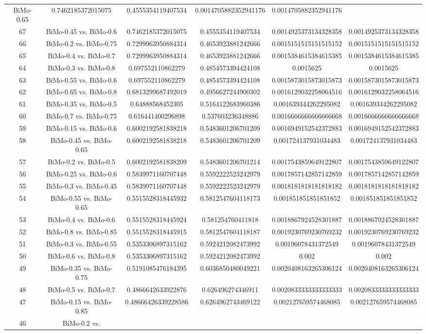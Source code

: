 \documentclass[a4paper,10pt]{article}
\begin{document}
\begin{landscape}
\begin{table}[!htp]
\begin{tabular}{cccccc}
BiMo-0.65&0.7462185372015075&0.4555354119407534&0.0014705882352941176&0.0014705882352941176\\67&BiMo-0.45 vs. BiMo-0.6&0.7462185372015075&0.4555354119407534&0.0014925373134328358&0.0014925373134328358\\66&BiMo-0.2 vs. BiMo-0.75&0.7299963950884314&0.4653923881242666&0.0015151515151515152&0.0015151515151515152\\65&BiMo-0.4 vs. BiMo-0.7&0.7299963950884314&0.4653923881242666&0.0015384615384615385&0.0015384615384615385\\64&BiMo-0.3 vs. BiMo-0.8&0.697552110862279&0.4854573394424108&0.0015625&0.0015625\\63&BiMo-0.55 vs. BiMo-0.6&0.697552110862279&0.4854573394424108&0.0015873015873015873&0.0015873015873015873\\62&BiMo-0.65 vs. BiMo-0.8&0.6813299687492019&0.4956627244900302&0.0016129032258064516&0.0016129032258064516\\61&BiMo-0.35 vs. BiMo-0.5&0.64888568452305&0.5164122683960386&0.001639344262295082&0.001639344262295082\\60&BiMo-0.7 vs. BiMo-0.75&0.616441400296898&0.537603236348886&0.0016666666666666668&0.0016666666666666668\\59&BiMo-0.15 vs. BiMo-0.6&0.6002192581838218&0.5483601206701209&0.0016949152542372883&0.0016949152542372883\\58&BiMo-0.45 vs. BiMo-0.65&0.6002192581838218&0.5483601206701209&0.001724137931034483&0.001724137931034483\\57&BiMo-0.2 vs. BiMo-0.5&0.6002192581838209&0.5483601206701214&0.0017543859649122807&0.0017543859649122807\\56&BiMo-0.25 vs. BiMo-0.6&0.5839971160707448&0.5592222523242979&0.0017857142857142859&0.0017857142857142859\\55&BiMo-0.3 vs. BiMo-0.45&0.5839971160707448&0.5592222523242979&0.0018181818181818182&0.0018181818181818182\\54&BiMo-0.55 vs. BiMo-0.65&0.5515528318445932&0.5812547604118173&0.001851851851851852&0.001851851851851852\\53&BiMo-0.4 vs. BiMo-0.6&0.5515528318445924&0.581254760411818&0.0018867924528301887&0.0018867924528301887\\52&BiMo-0.8 vs. BiMo-0.85&0.5515528318445915&0.5812547604118187&0.0019230769230769232&0.0019230769230769232\\51&BiMo-0.3 vs. BiMo-0.55&0.5353306897315162&0.5924212082473992&0.00196078431372549&0.00196078431372549\\50&BiMo-0.6 vs. BiMo-0.8&0.5353306897315162&0.5924212082473992&0.002&0.002\\49&BiMo-0.35 vs. BiMo-0.75&0.5191085476184395&0.6036850480049221&0.0020408163265306124&0.0020408163265306124\\48&BiMo-0.5 vs. BiMo-0.7&0.4866642633922876&0.626496274346911&0.0020833333333333333&0.0020833333333333333\\47&BiMo-0.15 vs. BiMo-0.85&0.48666426339228586&0.6264962743469122&0.002127659574468085&0.002127659574468085\\46&BiMo-0.2 vs. 
\end{tabular}
\end{table}
\end{landscape}
\end{document}
